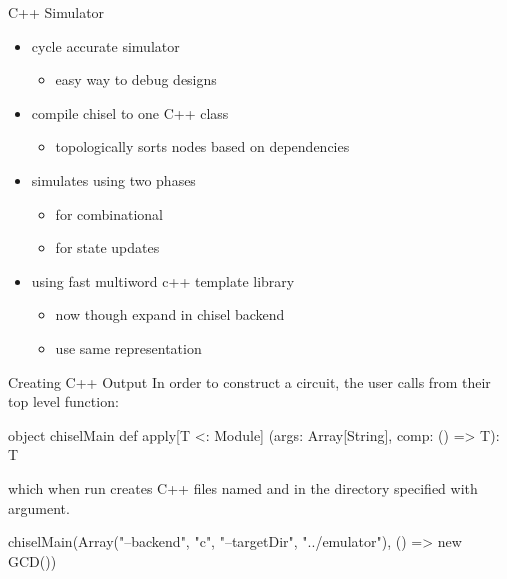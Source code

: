\documentclass[xcolor=pdflatex,dvipsnames,table]{beamer}
\begin{document}
\begin{frame}[fragile]{C++ Simulator}
\begin{itemize}
\item cycle accurate simulator
\begin{itemize}
\item easy way to debug designs
\end{itemize}
\item compile chisel to one C++ class
\begin{itemize}
\item topologically sorts nodes based on dependencies
\end{itemize}
\item simulates using two phases
\begin{itemize}
\item {} for combinational
\item {} for state updates
\end{itemize}
\item using fast multiword c++ template library
\begin{itemize}
\item now though expand in chisel backend
\item use same representation 
\end{itemize}
\end{itemize}
\end{frame}

\begin{frame}[fragile]{Creating C++ Output}
In order to construct a circuit, 
the user calls  from their top level  function:

\begin{scala}
object chiselMain {
  def apply[T <: Module]
    (args: Array[String], comp: () => T): T
}
\end{scala}

\noindent
which when run creates C++ files named
 and  in
the directory specified with
 argument.

\begin{scala}
chiselMain(Array("--backend", "c", "--targetDir", "../emulator"), 
           () => new GCD())
\end{scala}

\end{frame}
\end{document}
